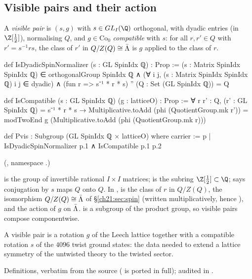 \subsection{Visible pairs and their action}

\begin{definition}\label{ch21:def:Pvis}
A \emph{visible pair} is $(s,g)$ with $s\in GL_I(\Q)$ orthogonal, with dyadic entries (in $\Z[\tfrac12]$),
normalising $Q$, and $g\in\mathrm{Co}_0$ \emph{compatible} with $s$: for all $r,r'\in Q$ with
$r'=s^{-1}rs$, the class of $r'$ in $Q/Z(Q)\cong\bar{\Lambda}$ is $g$ applied to the class of $r$.
\end{definition}
\begin{leancode}
def IsDyadicSpinNormalizer (s : GL SpinIdx ℚ) : Prop :=
  (s : Matrix SpinIdx SpinIdx ℚ) ∈ orthogonalGroup SpinIdx ℚ ∧
    (∀ i j, (s : Matrix SpinIdx SpinIdx ℚ) i j ∈ dyadic) ∧
    (fun r => s⁻¹ * r * s) '' (Q : Set (GL SpinIdx ℚ)) = Q
\end{leancode}
\begin{leancode}
def IsCompatible (s : GL SpinIdx ℚ) (g : latticeO) : Prop :=
  ∀ r r' : Q, (r' : GL SpinIdx ℚ) = s⁻¹ * r * s →
    Multiplicative.toAdd (phi (QuotientGroup.mk r')) =
      modTwoEnd g (Multiplicative.toAdd (phi (QuotientGroup.mk r)))
\end{leancode}
\begin{leancode}
def Pvis : Subgroup (GL SpinIdx ℚ × latticeO) where
  carrier := {p | IsDyadicSpinNormalizer p.1 ∧ IsCompatible p.1 p.2}
\end{leancode}
(, namespace .)
\begin{dictionary}
 is the group of invertible rational $I\times I$ matrices;  is the subring
$\Z[\tfrac12]\subset\Q$;  says conjugation by $s$ maps $Q$ onto $Q$.
In ,  is the class of $r$ in $Q/Z(Q)$,  the
isomorphism $Q/Z(Q)\cong\bar{\Lambda}$ of \S\ref{ch21:sec:spin} (written multiplicatively, hence
), and  the action of $g$ on $\bar{\Lambda}$.   is a
subgroup of the product group, so visible pairs compose componentwise.
\end{dictionary}
\begin{physics}
A visible pair is a rotation $g$ of the Leech lattice together with a compatible rotation $s$ of the
$4096$ twist ground states: the data needed to extend a lattice symmetry of the untwisted theory to the
twisted sector.
\end{physics}
\begin{status}
Definitions, verbatim from the source ( is ported in full); 
audited in .
\end{status}

